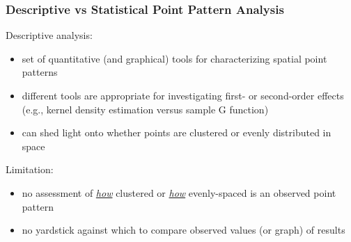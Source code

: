 \documentclass[10pt]{beamer}\usepackage[]{graphicx}\usepackage[]{color}
\newcommand{\bblock}{\begin{block}}
\newcommand{\eblock}{\end{block}}
\begin{document}
\begin{frame}
\frametitle{Descriptive vs Statistical Point Pattern Analysis}

\bblock{{Descriptive analysis:}}
\begin{itemize}
\item set of quantitative (and graphical) tools for characterizing
spatial point patterns
\item different tools are appropriate for investigating first- or
second-order effects (e.g., kernel density estimation versus sample
G function)
\item  can shed light onto whether points are clustered or evenly
distributed in space
\end{itemize}
\eblock

\bblock{{Limitation:}}
\begin{itemize}
\item no assessment of \emph{\underline{how}} clustered or
\emph{\underline{how}} evenly-spaced is an
observed point pattern
\item no yardstick against which to compare observed values (or
graph) of results
\end{itemize}
\eblock

\end{frame}
\end{document}
